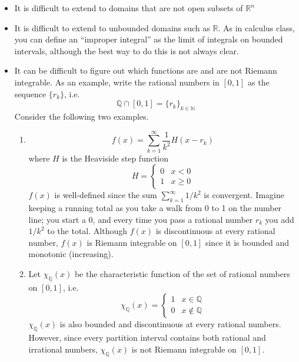 \documentclass[10pt]{article}         %
\theoremstyle{remark}
\newcommand{\N}{\mathbb{N}}
\newcommand{\R}{\mathbb{R}}
\newcommand{\Q}{\mathbb{Q}}
\begin{document}
\begin{itemize}
    \item It is difficult to extend to domains that are not open subsets of $\R^n$
    \item It is difficult to extend to unbounded domains such as $\R$. As in calculus class, you can define an ``improper integral'' as the limit of integrals on bounded intervals, although the best way to do this is not always clear.
    \item It can be difficult to figure out which functions are and are not Riemann integrable. As an example, write the rational numbers in $[0, 1]$ as the sequence $\{ r_k \}$, i.e.
    \[
    \Q \cap [0, 1] = \{ r_k \}_{k \in \N}
    \]
    Consider the following two examples.
    \begin{enumerate}
        \item 
        \[
        f(x) = \sum_{k=1}^\infty \frac{1}{k^2}H(x - r_k)
        \]
        where $H$ is the Heaviside step function
        \[
        H = \begin{cases}
        0 & x < 0 \\
        1 & x \geq 0
        \end{cases}
        \]
        $f(x)$ is well-defined since the sum $\sum_{k=1}^\infty 1/k^2$ is convergent. Imagine keeping a running total as you take a walk from 0 to 1 on the number line; you start a 0, and every time you pass a rational number $r_k$ you add $1/k^2$ to the total. Although $f(x)$ is discontinuous at every rational number, $f(x)$ is Riemann integrable on $[0, 1]$ since it is bounded and monotonic (increasing).
        \item Let $\chi_\Q(x)$ be the characteristic function of the set of rational numbers on $[0, 1]$, i.e.
        \[
        \chi_\Q(x) = 
        \begin{cases}
        1 & x \in \Q \\
        0 & x \notin \Q
        \end{cases}
        \]
        $\chi_\Q(x)$ is also bounded and discontinuous at every rational numbers. However, since every partition interval contains both rational and irrational numbers, $\chi_\Q(x)$ is not Riemann integrable on $[0, 1]$.
    \end{enumerate}
    

\end{itemize}
\end{document}
